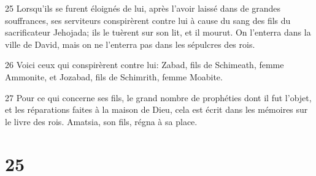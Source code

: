 \par 25 Lorsqu'ils se furent éloignés de lui, après l'avoir laissé dans de grandes souffrances, ses serviteurs conspirèrent contre lui à cause du sang des fils du sacrificateur Jehojada; ils le tuèrent sur son lit, et il mourut. On l'enterra dans la ville de David, mais on ne l'enterra pas dans les sépulcres des rois.
\par 26 Voici ceux qui conspirèrent contre lui: Zabad, fils de Schimeath, femme Ammonite, et Jozabad, fils de Schimrith, femme Moabite.
\par 27 Pour ce qui concerne ses fils, le grand nombre de prophéties dont il fut l'objet, et les réparations faites à la maison de Dieu, cela est écrit dans les mémoires sur le livre des rois. Amatsia, son fils, régna à sa place.

\chapter{25}

